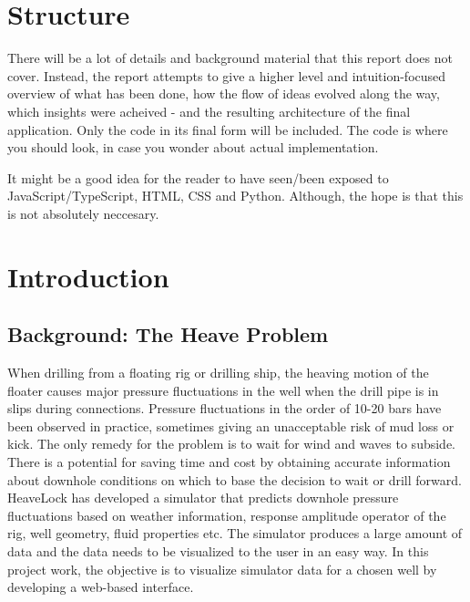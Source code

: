 \newpage{}
\tableofcontents{}
\newpage{}

\hypertarget{structure}{%
\section{Structure}\label{structure}}

There will be a lot of details and background material that this report
does not cover. Instead, the report attempts to give a higher level and
intuition-focused overview of what has been done, how the flow of ideas
evolved along the way, which insights were acheived - and the resulting
architecture of the final application. Only the code in its final form
will be included. The code is where you should look, in case you wonder
about actual implementation.

It might be a good idea for the reader to have seen/been exposed to
JavaScript/TypeScript, HTML, CSS and Python. Although, the hope is that
this is not absolutely neccesary.

\hypertarget{introduction}{%
\section{Introduction}\label{introduction}}

\hypertarget{background-the-heave-problem}{%
\subsection{Background: The Heave
Problem}\label{background-the-heave-problem}}

When drilling from a floating rig or drilling ship, the heaving motion
of the floater causes major pressure fluctuations in the well when the
drill pipe is in slips during connections. Pressure fluctuations in the
order of 10-20 bars have been observed in practice, sometimes giving an
unacceptable risk of mud loss or kick. The only remedy for the problem
is to wait for wind and waves to subside. There is a potential for
saving time and cost by obtaining accurate information about downhole
conditions on which to base the decision to wait or drill forward.
HeaveLock has developed a simulator that predicts downhole pressure
fluctuations based on weather information, response amplitude operator
of the rig, well geometry, fluid properties etc. The simulator produces
a large amount of data and the data needs to be visualized to the user
in an easy way. In this project work, the objective is to visualize
simulator data for a chosen well by developing a web-based interface.

